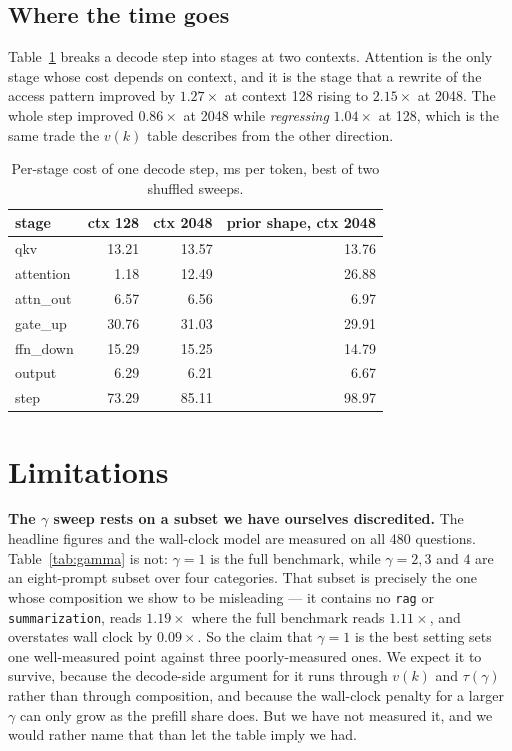 \documentclass[conference]{IEEEtran}
\begin{document}
\subsection{Where the time goes}

Table~\ref{tab:stages} breaks a decode step into stages at two contexts. Attention is the only stage
whose cost depends on context, and it is the stage that a rewrite of the access pattern improved by
$1.27\times$ at context 128 rising to $2.15\times$ at 2048. The whole step improved $0.86\times$ at
2048 while \emph{regressing} $1.04\times$ at 128, which is the same trade the $v(k)$ table describes
from the other direction.

\begin{table}[t]
\caption{Per-stage cost of one decode step, ms per token, best of two shuffled sweeps.}
\label{tab:stages}
\centering
\begin{tabular}{@{}lrrr@{}}
\toprule
stage & ctx 128 & ctx 2048 & prior shape, ctx 2048 \\
\midrule
qkv       & 13.21 & 13.57 & 13.76 \\
attention & 1.18  & 12.49 & 26.88 \\
attn\_out & 6.57  & 6.56  & 6.97 \\
gate\_up  & 30.76 & 31.03 & 29.91 \\
ffn\_down & 15.29 & 15.25 & 14.79 \\
output    & 6.29  & 6.21  & 6.67 \\
\midrule
step      & 73.29 & 85.11 & 98.97 \\
\bottomrule
\end{tabular}
\end{table}

\section{Limitations}
\label{sec:limits}

\textbf{The $\gamma$ sweep rests on a subset we have ourselves discredited.} The headline figures and
the wall-clock model are measured on all 480 questions. Table~\ref{tab:gamma} is not: $\gamma=1$ is
the full benchmark, while $\gamma = 2, 3$ and $4$ are an eight-prompt subset over four categories.
That subset is precisely the one whose composition we show to be misleading --- it contains no
\texttt{rag} or \texttt{summarization}, reads $1.19\times$ where the full benchmark reads
$1.11\times$, and overstates wall clock by $0.09\times$. So the claim that $\gamma=1$ is the best
setting sets one well-measured point against three poorly-measured ones. We expect it to survive,
because the decode-side argument for it runs through $v(k)$ and $\tau(\gamma)$ rather than through
composition, and because the wall-clock penalty for a larger $\gamma$ can only grow as the prefill
share does. But we have not measured it, and we would rather name that than let the table imply we
had.
\end{document}
